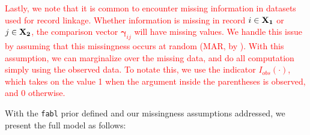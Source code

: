 \documentclass[ba]{imsart}
\begin{document}
\textcolor{red}{Lastly, we note that it is common to encounter missing information in datasets used for record linkage. Whether information is missing in record $i \in \bf{X}_1$ or $j \in \bf{X}_2$, the comparison vector $\mathbf{\gamma}_{ij}$ will have missing values. We handle this issue by assuming that this missingness occurs at random (MAR, by \cite{LittleRubin2002}). With this assumption, we can marginalize over the missing data, and do all computation simply using the observed data. To notate this, we use the indicator $I_{obs}(\cdot)$, which takes on the value 1 when the argument inside the parentheses is observed, and 0 otherwise.}


%

With the \texttt{fabl} prior defined and our missingness assumptions addressed, we present the full model as follows: 

\end{document}
